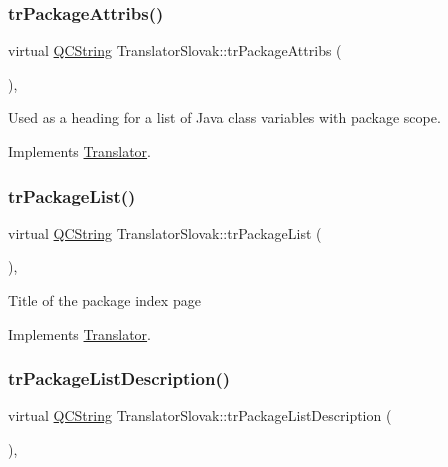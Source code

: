 \subsubsection{\texorpdfstring{trPackageAttribs()}{trPackageAttribs()}}
{\footnotesize\ttfamily virtual \mbox{\hyperlink{class_q_c_string}{Q\+C\+String}} Translator\+Slovak\+::tr\+Package\+Attribs (\begin{DoxyParamCaption}{ }\end{DoxyParamCaption})\hspace{0.3cm}{\ttfamily [inline]}, {\ttfamily [virtual]}}

Used as a heading for a list of Java class variables with package scope. 

Implements \mbox{\hyperlink{class_translator}{Translator}}.

\mbox{\label{class_translator_slovak_a0c662aa68c32df904a4315960a099256}} 
\subsubsection{\texorpdfstring{trPackageList()}{trPackageList()}}
{\footnotesize\ttfamily virtual \mbox{\hyperlink{class_q_c_string}{Q\+C\+String}} Translator\+Slovak\+::tr\+Package\+List (\begin{DoxyParamCaption}{ }\end{DoxyParamCaption})\hspace{0.3cm}{\ttfamily [inline]}, {\ttfamily [virtual]}}

Title of the package index page 

Implements \mbox{\hyperlink{class_translator}{Translator}}.

\mbox{\label{class_translator_slovak_a42a2dd443f92669bd8aee49595bf1ac0}} 
\subsubsection{\texorpdfstring{trPackageListDescription()}{trPackageListDescription()}}
{\footnotesize\ttfamily virtual \mbox{\hyperlink{class_q_c_string}{Q\+C\+String}} Translator\+Slovak\+::tr\+Package\+List\+Description (\begin{DoxyParamCaption}{ }\end{DoxyParamCaption})\hspace{0.3cm}{\ttfamily [inline]}, {\ttfamily [virtual]}}

